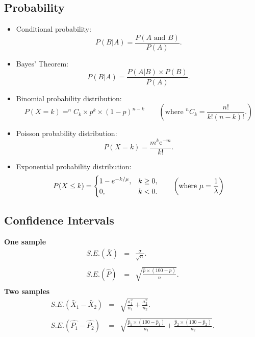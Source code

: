 \documentclass[a4paper,12pt]{article}
\begin{document}
\subsection*{Probability}
\begin{itemize}

\item Conditional probability:
\begin{equation*}
P(B|A)=\frac{P\left( A\text{ and }B\right) }{P\left( A\right) }.
\end{equation*}


\item Bayes' Theorem:
\begin{equation*}
P(B|A)=\frac{P\left(A|B\right) \times P(B) }{P\left( A\right) }.
\end{equation*}





\item Binomial probability distribution:
\begin{equation*}
P(X = k) = ^{n}C_{k} \times p^{k} \times \left( 1-p\right) ^{n-k}\qquad \left( \text{where  }
^{n}C_{k} =\frac{n!}{k!\left(n-k\right) !}. \right)
\end{equation*}

\item Poisson probability distribution:
\begin{equation*}
P(X = k) =\frac{m^{k}\mathrm{e}^{-m}}{k!}.
\end{equation*}

\item Exponential probability distribution:
\begin{equation*}
P(X \leq k) = \begin{cases}
1-e^{- k/\mu}, & k \ge 0, \\
0, & k < 0.
\end{cases}\qquad \left( \text{where  }
\mu = {1\over \lambda}\right)
\end{equation*}
\end{itemize}



\subsection*{Confidence Intervals}
{\bf One sample}
\begin{eqnarray*} S.E.(\bar{X})&=&\frac{\sigma}{\sqrt{n}}.\\\\
S.E.(\hat{P})&=&\sqrt{\frac{\hat{p}\times(100-\hat{p})}{n}}.\\
\end{eqnarray*}
{\bf Two samples}
\begin{eqnarray*}
S.E.(\bar{X}_1-\bar{X}_2)&=&\sqrt{\frac{\sigma^2_1}{n_1}+\frac{\sigma_2^2}{n_2}}.\\\\
S.E.(\hat{P_1}-\hat{P_2})&=&\sqrt{\frac{\hat{p}_1\times(100-\hat{p}_1)}{n_1}+\frac{\hat{p}_2\times(100-\hat{p}_2)}{n_2}}.\\\\
\end{eqnarray*}
\end{document}
